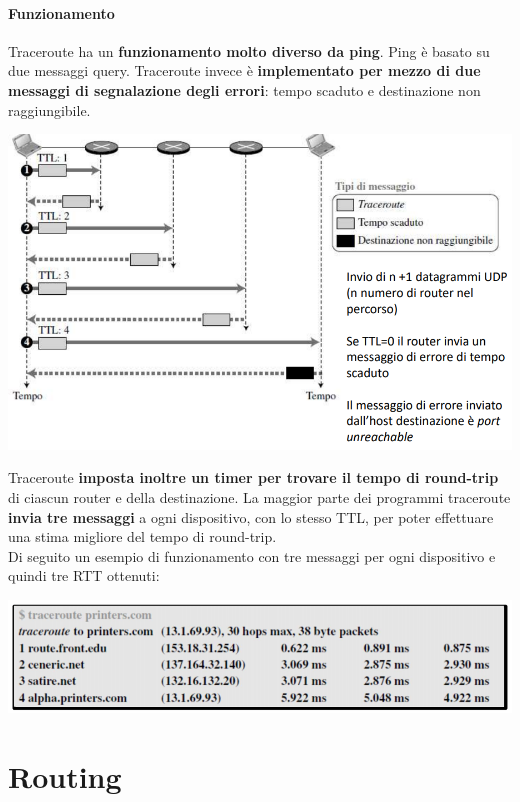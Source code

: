 \documentclass[10pt]{article}
\begin{document}
\paragraph{Funzionamento} Traceroute ha un \textbf{funzionamento molto diverso da ping}. Ping è basato su due messaggi query. Traceroute invece è \textbf{implementato per mezzo di due messaggi di segnalazione degli errori}: tempo scaduto e destinazione non raggiungibile.
\begin{center}
\includegraphics[scale=0.7]{traceroute.png}
\end{center}
Traceroute \textbf{imposta inoltre un timer per trovare il tempo di round-trip} di ciascun router e della destinazione. La maggior parte dei programmi traceroute \textbf{invia tre messaggi} a ogni dispositivo, con lo stesso TTL, per poter effettuare una stima migliore del tempo di round-trip.\\
Di seguito un esempio di funzionamento con tre messaggi per ogni dispositivo e quindi tre RTT ottenuti:
\begin{center}
\includegraphics[scale=0.7]{tracerouteesempio.png}
\end{center}
\pagebreak
\section{Routing}
\end{document}
